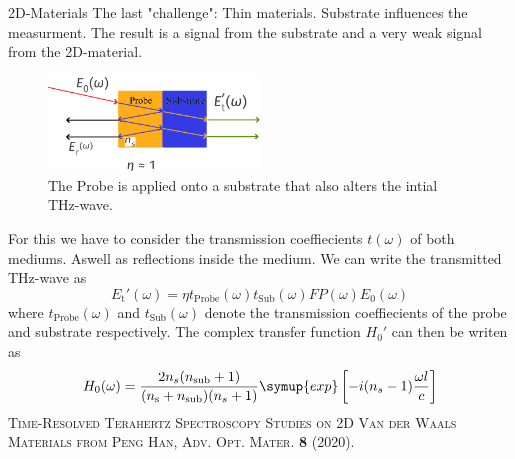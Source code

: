 \documentclass[aspectratio=1610, 9pt]{beamer}
\begin{document}
\begin{frame}{2D-Materials}
  The last "challenge": Thin materials.
  Substrate influences the measurment.
  The result is a signal from the substrate and a very weak signal from the 2D-material.
  \begin{figure}
    \includegraphics[width=0.5\textwidth]{images/2d.pdf}
    \caption{The Probe is applied onto a substrate that also alters the intial THz-wave.}
  \end{figure}
\end{frame}

\begin{frame}
  For this we have to consider the transmission coeffiecients $t(\omega)$ of both mediums.
  Aswell as reflections inside the medium.
  We can write the transmitted THz-wave as
  \begin{equation}
    E_\text{t} '(\omega) = \eta t_\text{Probe}(\omega) t_\text{Sub}(\omega)FP(\omega)E_0(\omega)
  \end{equation}
  where $t_\text{Probe}(\omega)$ and $t_\text{Sub}(\omega)$ denote the transmission coeffiecients of the probe and substrate respectively.
  The complex transfer function $H_0'$ can then be writen as 
  \begin{equation}
    H_0(\omega) = \frac{2 n_s(n_\text{sub} + 1)}{(n_\text{s} + n_\text{sub})(n_s + 1)} \symup{exp}\left[ - i (n_s - 1) \frac{\omega l }{c}\right]
  \end{equation}
  \textsc{\textcolor{tugreen}{Time-Resolved Terahertz Spectroscopy Studies on 2D Van der Waals Materials} from Peng Han, Adv. Opt. Mater. \textbf{8} (2020).}
\end{frame}
\end{document}
